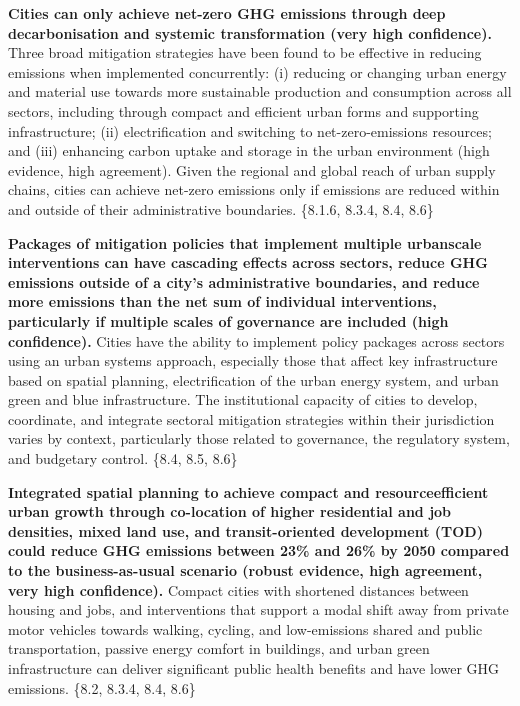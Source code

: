 \documentclass[
  letterpaper,
  DIV=11,
  numbers=noendperiod]{scrreprt}
\begin{document}
\textbf{Cities can only achieve net-zero GHG emissions through deep
decarbonisation and systemic transformation (very high confidence).}
Three broad mitigation strategies have been found to be effective in
reducing emissions when implemented concurrently: (i) reducing or
changing urban energy and material use towards more sustainable
production and consumption across all sectors, including through compact
and efficient urban forms and supporting infrastructure; (ii)
electrification and switching to net-zero-emissions resources; and (iii)
enhancing carbon uptake and storage in the urban environment (high
evidence, high agreement). Given the regional and global reach of urban
supply chains, cities can achieve net-zero emissions only if emissions
are reduced within and outside of their administrative boundaries.
\{8.1.6, 8.3.4, 8.4, 8.6\}

\textbf{Packages of mitigation policies that implement multiple
urbanscale interventions can have cascading effects across sectors,
reduce GHG emissions outside of a city's administrative boundaries, and
reduce more emissions than the net sum of individual interventions,
particularly if multiple scales of governance are included (high
confidence).} Cities have the ability to implement policy packages
across sectors using an urban systems approach, especially those that
affect key infrastructure based on spatial planning, electrification of
the urban energy system, and urban green and blue infrastructure. The
institutional capacity of cities to develop, coordinate, and integrate
sectoral mitigation strategies within their jurisdiction varies by
context, particularly those related to governance, the regulatory
system, and budgetary control. \{8.4, 8.5, 8.6\}

\textbf{Integrated spatial planning to achieve compact and
resourceefficient urban growth through co-location of higher residential
and job densities, mixed land use, and transit-oriented development
(TOD) could reduce GHG emissions between 23\% and 26\% by 2050 compared
to the business-as-usual scenario (robust evidence, high agreement, very
high confidence).} Compact cities with shortened distances between
housing and jobs, and interventions that support a modal shift away from
private motor vehicles towards walking, cycling, and low-emissions
shared and public transportation, passive energy comfort in buildings,
and urban green infrastructure can deliver significant public health
benefits and have lower GHG emissions. \{8.2, 8.3.4, 8.4, 8.6\}
\end{document}
